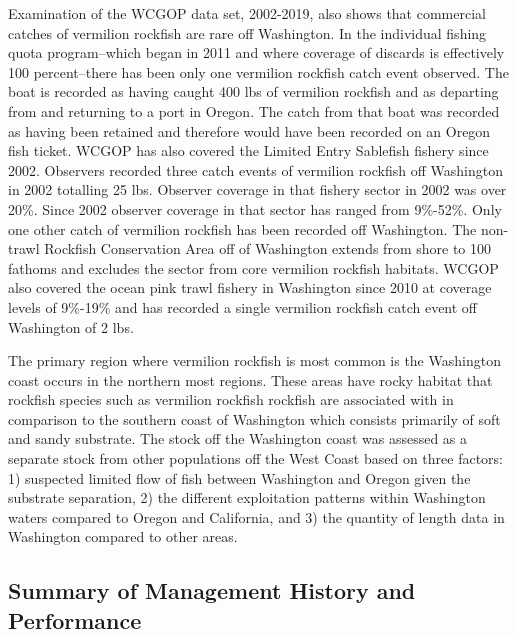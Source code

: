 \documentclass[11pt,
  english,
  a4paper,
]{article}
\begin{document}
Examination of the WCGOP data set, 2002-2019, also shows that commercial catches of vermilion rockfish are rare off Washington. In the individual fishing quota program--which began in 2011 and where coverage of discards is effectively 100 percent--there has been only one vermilion rockfish catch event observed. The boat is recorded as having caught 400 lbs of vermilion rockfish and as departing from and returning to a port in Oregon. The catch from that boat was recorded as having been retained and therefore would have been recorded on an Oregon fish ticket. WCGOP has also covered the Limited Entry Sablefish fishery since 2002. Observers recorded three catch events of vermilion rockfish off Washington in 2002 totalling 25 lbs. Observer coverage in that fishery sector in 2002 was over 20\%. Since 2002 observer coverage in that sector has ranged from 9\%-52\%. Only one other catch of vermilion rockfish has been recorded off Washington. The non-trawl Rockfish Conservation Area off of Washington extends from shore to 100 fathoms and excludes the sector from core vermilion rockfish habitats. WCGOP also covered the ocean pink trawl fishery in Washington since 2010 at coverage levels of 9\%-19\% and has recorded a single vermilion rockfish catch event off Washington of 2 lbs.

\leavevmode\tagmcend\tagstructend\par


The primary region where vermilion rockfish is most common is the Washington coast occurs in the northern most regions. These areas have rocky habitat that rockfish species such as vermilion rockfish rockfish are associated with in comparison to the southern coast of Washington which consists primarily of soft and sandy substrate. The stock off the Washington coast was assessed as a separate stock from other populations off the West Coast based on three factors: 1) suspected limited flow of fish between Washington and Oregon given the substrate separation, 2) the different exploitation patterns within Washington waters compared to Oregon and California, and 3) the quantity of length data in Washington compared to other areas.

\leavevmode\tagmcend\tagstructend\par


\hypertarget{summary-of-management-history-and-performance}{%
\subsection{Summary of Management History and Performance}\label{summary-of-management-history-and-performance}}
\end{document}
